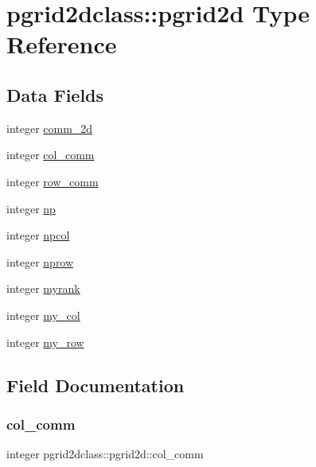\hypertarget{structpgrid2dclass_1_1pgrid2d}{}\section{pgrid2dclass\+::pgrid2d Type Reference}
\label{structpgrid2dclass_1_1pgrid2d}
\subsection*{Data Fields}
\begin{DoxyCompactItemize}
\item 
integer \mbox{\hyperlink{structpgrid2dclass_1_1pgrid2d_ae763e51a65cd215ff76ea16e829e8bf0}{comm\+\_\+2d}}
\item 
integer \mbox{\hyperlink{structpgrid2dclass_1_1pgrid2d_ab131ddd73cd143b1ba32af178309485d}{col\+\_\+comm}}
\item 
integer \mbox{\hyperlink{structpgrid2dclass_1_1pgrid2d_a69b25ed31a7249c8940100a8977dc1b9}{row\+\_\+comm}}
\item 
integer \mbox{\hyperlink{structpgrid2dclass_1_1pgrid2d_a058fc00a4851927b9f36da91b8188b49}{np}}
\item 
integer \mbox{\hyperlink{structpgrid2dclass_1_1pgrid2d_a11d5de618bb0089e48647343ac855183}{npcol}}
\item 
integer \mbox{\hyperlink{structpgrid2dclass_1_1pgrid2d_a5c94f44dfc943c9d0ffe88a6316999e8}{nprow}}
\item 
integer \mbox{\hyperlink{structpgrid2dclass_1_1pgrid2d_ae8fc69fae700a32ac9003f8d4c414ee9}{myrank}}
\item 
integer \mbox{\hyperlink{structpgrid2dclass_1_1pgrid2d_a912f6614074dde9e6f2c6d6f34d7cb99}{my\+\_\+col}}
\item 
integer \mbox{\hyperlink{structpgrid2dclass_1_1pgrid2d_a722de079e498f0585f76a3d2680a6fbe}{my\+\_\+row}}
\end{DoxyCompactItemize}


\subsection{Field Documentation}
\mbox{\label{structpgrid2dclass_1_1pgrid2d_ab131ddd73cd143b1ba32af178309485d}} 
\subsubsection{\texorpdfstring{col\_comm}{col\_comm}}
{\footnotesize\ttfamily integer pgrid2dclass\+::pgrid2d\+::col\+\_\+comm}

